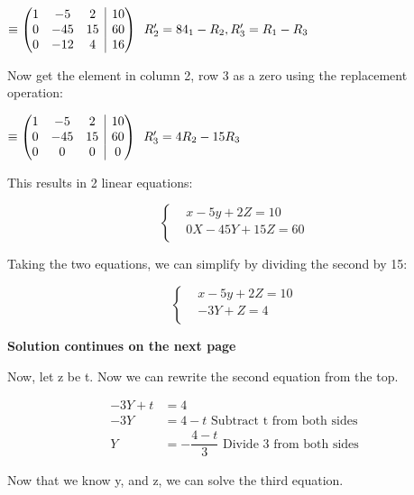 \documentclass[12pt]{book}
\makeatletter
\newenvironment{amatrix}[1]{%
  \left(\begin{array}{@{}*{#1}{c}|c@{}}
}{%
  \end{array}\right)
}
\makeatother
\begin{document}
\begin{enumerate}
$
\equiv
\begin{amatrix}{3}
   1 & -5 & 2 & 10\\  0 & -45 & 15 & 60\\ 0 & -12 & 4  & 16
 \end{amatrix}
 \text{\space \space } R'_2 = 84_1-R_2, R'_3=R_1-R_3
$

\vspace{0.4cm}
Now get the element in column 2, row 3 as a zero using the replacement operation:
\vspace{0.4cm}

$
\equiv
\begin{amatrix}{3}
   1 & -5 & 2 & 10\\  0 & -45 & 15 & 60\\ 0 & 0 & 0 & 0
 \end{amatrix}
 \text{\space \space } R'_3 = 4R_2 - 15R_3
$

\vspace{0.4cm}
This results in 2 linear equations:

\[ \begin{cases} 
  & x-5y+2Z=10 \\
  & 0X-45Y+15Z=60 \\
\end{cases}
\]

Taking the two equations, we can simplify by dividing the second by 15:

\[ \begin{cases} 
  & x-5y+2Z=10 \\
  & -3Y+Z=4 \\
\end{cases}
\]

\begin{center}
  \vspace{0.5cm}
  \textbf{Solution continues on the next page}
\end{center}

\newpage

Now, let z be t. Now we can rewrite the second equation from the top.

\addtolength{\jot}{-0.2em}
\begin{align*}
  -3Y+t &=4 \\
  -3Y &= 4-t \text{ Subtract t from both sides} \\
  Y &= -\dfrac{4-t}{3} \text{ Divide 3 from both sides}
\end{align*}

Now that we know y, and z, we can solve the third equation. 


\end{enumerate}
\end{document}
